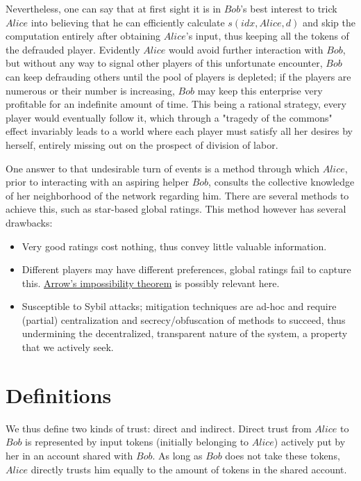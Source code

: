   Nevertheless, one can say that at first sight it is in $Bob$'s best interest to trick $Alice$ into believing that he can
  efficiently calculate $s\left(idx, Alice, d\right)$ and skip the computation entirely after obtaining $Alice$'s input,
  thus keeping all the tokens of the defrauded player. Evidently $Alice$ would avoid further interaction with $Bob$, but
  without any way to signal other players of this unfortunate encounter, $Bob$ can keep defrauding others until the pool of
  players is depleted; if the players are numerous or their number is increasing, $Bob$ may keep this enterprise very
  profitable for an indefinite amount of time. This being a rational strategy, every player would eventually follow it, which
  through a "tragedy of the commons" effect invariably leads to a world where each player must satisfy all her desires by
  herself, entirely missing out on the prospect of division of labor.

  One answer to that undesirable turn of events is a method through which $Alice$, prior to interacting with an aspiring
  helper $Bob$, consults the collective knowledge of her neighborhood of the network regarding him. There are several
  methods to achieve this, such as star-based global ratings. This method however has several drawbacks:

  \begin{itemize}
    \item Very good ratings cost nothing, thus convey little valuable information.
    \item Different players may have different preferences, global ratings fail to capture this.
    \href{https://en.wikipedia.org/wiki/Arrow\%27s_impossibility_theorem}{Arrow's impossibility theorem} is possibly relevant
    here.
    \item Susceptible to Sybil attacks; mitigation techniques are ad-hoc and require (partial) centralization and
    secrecy/obfuscation of methods to succeed, thus undermining the decentralized, transparent nature of the system, a
    property that we actively seek.
  \end{itemize}

\section{Definitions}
  We thus define two kinds of trust: direct and indirect. Direct trust from $Alice$ to $Bob$ is represented by input tokens
  (initially belonging to $Alice$) actively put by her in an account shared with $Bob$. As long as $Bob$ does not take these
  tokens, $Alice$ directly trusts him equally to the amount of tokens in the shared account.
  
